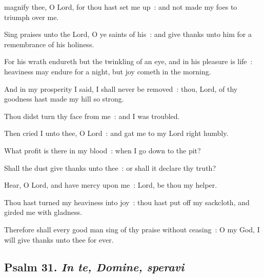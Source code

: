  magnify thee, O Lord, for thou hast set me up~: and not made my foes to triumph over me.\par
{}
Sing praises unto the Lord, O ye saints of his~: and give thanks unto him for a remembrance of his holiness.\par
{}For his wrath endureth but the twinkling of an eye, and in his pleasure is life~: heaviness may endure for a night, but joy cometh in the morning.\par
{}And in my prosperity I said, I shall never be removed~: thou, Lord, of thy goodness hast made my hill so strong.\par
{}Thou didst turn thy face from me~: and I was troubled.\par
{}Then cried I unto thee, O Lord~: and gat me to my Lord right humbly.\par
{}What profit is there in my blood~: when I go down to the pit?\par
{}Shall the dust give thanks unto thee~: or shall it declare thy truth?\par
{}Hear, O Lord, and have mercy upon me~: Lord, be thou my helper.\par
{}Thou hast turned my heaviness into joy~: thou hast put off my sackcloth, and girded me with gladness.\par
{}Therefore shall every good man sing of thy praise without ceasing~: O my God, I will give thanks unto thee for ever.\par

\subsection{Psalm 31. \textit{In te, Domine, speravi}}

